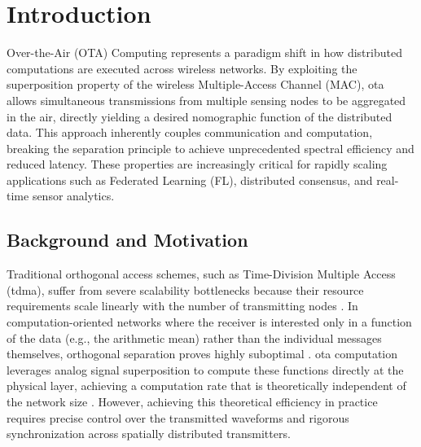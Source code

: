 \documentclass[Markos_Delaportas_1316.tex]{subfiles}
\begin{document}
\section*{Introduction}

Over-the-Air (OTA) Computing represents a paradigm shift in how distributed
computations are executed across wireless networks. By exploiting the
superposition property of the wireless Multiple-Access Channel (MAC),
\gls{ota} allows
simultaneous transmissions from multiple sensing nodes to be
aggregated in the air,
directly yielding a desired nomographic function of the distributed data. This
approach inherently couples communication and computation, breaking
the separation
principle to achieve unprecedented spectral efficiency and reduced
latency. These
properties are increasingly critical for rapidly scaling applications such as
Federated Learning (FL), distributed consensus, and real-time sensor analytics.

\subsection{Background and Motivation}
Traditional orthogonal access schemes, such as Time-Division Multiple
Access (\gls{tdma}),
suffer from severe scalability bottlenecks because their resource
requirements scale
linearly with the number of transmitting nodes
\cite{sahin_survey_2023}. In computation-oriented
networks where the receiver is interested only in a function of the
data (e.g., the arithmetic
mean) rather than the individual messages themselves, orthogonal
separation proves highly
suboptimal \cite{nazer_reliable_nodate, goldenbaum_robust_2013}.
\gls{ota} computation leverages
analog signal superposition to compute these functions directly at
the physical layer,
achieving a computation rate that is theoretically independent of the
network size \cite{goldenbaum_nomographic_2015}.
However, achieving this theoretical efficiency in practice requires
precise control over the
transmitted waveforms and rigorous synchronization across spatially
distributed transmitters.
\end{document}
